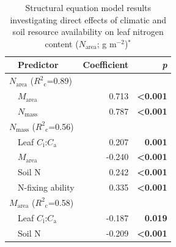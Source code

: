 \newpage
\begin{table}
    \centering
    \caption[Structural equation model results investigating direct effects of climatic and soil resource availability on leaf nitrogen content]{Structural equation model results investigating direct effects of climatic and soil resource availability on leaf nitrogen content ($N_\mathrm{area}$; g m$^{-2}$)$^*$}
        \begin{tabular}{p{0.5cm}p{3cm}p{1.5cm}p{1.5cm}}
            \hline
            & Predictor & \multicolumn{1}{r}{Coefficient} & \multicolumn{1}{r}{\textit{p}} \\
            \hline

            \multicolumn{2}{l}{$N_\mathrm{area}$ ($R^2{}_\mathrm{c}$=0.89)} && \\
            & \multicolumn{1}{l}{$M_\mathrm{area}$} & \multicolumn{1}{r}{0.713}     & \multicolumn{1}{r}{\textbf{<0.001}} \\
            & \multicolumn{1}{l}{$N_\mathrm{mass}$} & \multicolumn{1}{r}{0.787}     & \multicolumn{1}{r}{\textbf{<0.001}} \\
            \hline

            \multicolumn{2}{l}{$N_\mathrm{mass}$ ($R^2{}_\mathrm{c}$=0.56)} && \\
            & \multicolumn{1}{l}{Leaf $C_\mathrm{i}$:$C_\mathrm{a}$}    & \multicolumn{1}{r}{0.207}     & \multicolumn{1}{r}{\textbf{0.001}} \\
            & \multicolumn{1}{l}{$M_\mathrm{area}$}                     & \multicolumn{1}{r}{-0.240}    & \multicolumn{1}{r}{\textbf{<0.001}} \\
            & \multicolumn{1}{l}{Soil N}                                & \multicolumn{1}{r}{0.242}     & \multicolumn{1}{r}{\textbf{<0.001}} \\
            & \multicolumn{1}{l}{N-fixing ability}                      & \multicolumn{1}{r}{0.335}     & \multicolumn{1}{r}{\textbf{<0.001}} \\
            \hline

            \multicolumn{2}{l}{$M_\mathrm{area}$ ($R^2{}_\mathrm{c}$=0.58)} && \\
            & \multicolumn{1}{l}{Leaf $C_\mathrm{i}$:$C_\mathrm{a}$}    & \multicolumn{1}{r}{-0.187}    & \multicolumn{1}{r}{\textbf{0.019}} \\
            & \multicolumn{1}{l}{Soil N}                                & \multicolumn{1}{r}{-0.209}    & \multicolumn{1}{r}{\textbf{<0.001}} \\
            \hline


\end{tabular}
\end{table}
